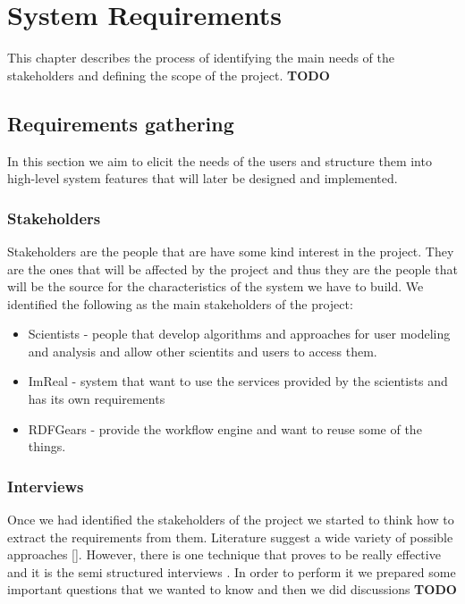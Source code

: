 
\chapter{System Requirements}

This chapter describes the process of identifying the main needs of the stakeholders and defining the scope of the project. \textbf{TODO}


\section{Requirements gathering}

In this section we aim to elicit the needs of the users and structure them into high-level system features that will later be designed and implemented.

\subsection{Stakeholders}

Stakeholders are the people that are have some kind interest in the project. They are the ones that will be affected by the project and thus they are the people that will be the source for the characteristics of the system we have to build. We identified the following as the main stakeholders of the project:  

\begin{itemize}
\item Scientists - people that develop algorithms and approaches for user modeling and analysis and allow other scientits and users to access them.
\item ImReal - system that want to use the services provided by the scientists and has its own requirements
\item RDFGears - provide the workflow engine and want to reuse some of the things.
\end{itemize}

\subsection{Interviews}

Once we had identified the stakeholders of the project we started to think how to extract the requirements from them. Literature suggest a wide variety of possible approaches []. However, there is one technique that proves to be really effective and it is the semi structured interviews \cite{Dieste}. In order to perform it we prepared some important questions that we wanted to know and then we did discussions \textbf{TODO}


